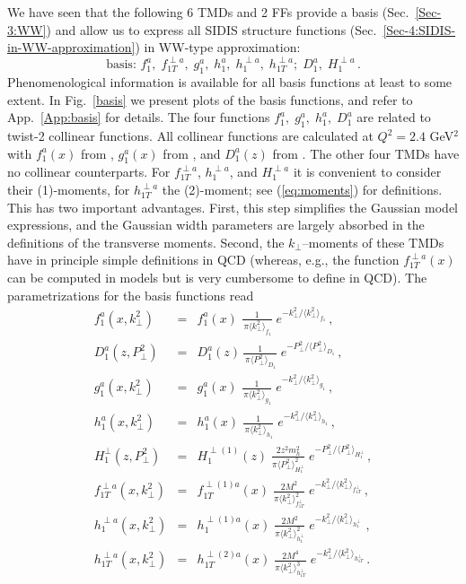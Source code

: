 \documentclass[a4paper,11pt]{article}
\newcommand{\be}{\begin{equation}}
\newcommand{\ee}{\end{equation}}
\newcommand{\ba}{\begin{eqnarray}}
\newcommand{\ea}{\end{eqnarray}}
\newcommand{\la}{\langle}
\newcommand{\ra}{\rangle}
\newcommand{\mh}{ m_h }
\def\kperp{k_\perp}
\def\pperp{P_\perp}
\def\avkperp{\la \kperp^2 \ra}
\def\avpperp{\la \pperp^2 \ra}
\begin{document}
We have seen that the following 6 TMDs and 2 FFs provide a basis
(Sec.~\ref{Sec-3:WW}) and allow us to express all SIDIS structure
functions (Sec.~\ref{Sec-4:SIDIS-in-WW-approximation})
in WW-type approximation:
\be\label{Eq:basis}
   \mbox{basis: \ \ }
   f_1^a, \; f_{1T}^{\perp a}, \; g_1^a, \; h_1^a, \;h_1^{\perp a},\; h_{1T}^{\perp a};
   \; D_1^a, \; H_1^{\perp a} \, .
\ee
Phenomenological information is available for all basis functions at
least to some extent.
In Fig.~\ref{basis} we present plots of the basis functions, and refer
to App.~\ref{App:basis} for details.
The four functions $f_1^a, \; g_1^a, \; h_1^a,\; D_1^a$  are related to
twist-2 collinear functions. All collinear functions are calculated at
$Q^2 = 2.4$ GeV$^2$ with $f_1^a(x)$ from \cite{Martin:2009iq},
$g_1^a(x)$ from \cite{Gluck:1998xa}, and $D_1^a(z)$ from
\cite{deFlorian:2007aj}. The other four TMDs
have no collinear counterparts.
For $f_{1T}^{\perp a}$, $h_1^{\perp a}$, and $H_1^{\perp a}$ it is convenient to
consider their (1)-moments, for $ h_{1T}^{\perp a}$  the (2)-moment;
see (\ref{eq:moments}) for definitions.
This has two important advantages. First, this step simplifies
the Gaussian model expressions, and the Gaussian width parameters are
largely absorbed in the definitions of the transverse moments. Second,
the $k_\perp$--moments of these TMDs have in principle simple definitions
in QCD (whereas, e.g., the function $f_{1T}^{\perp a}(x)$ can be computed in
models but is very cumbersome to define in QCD).
The parametrizations for the basis functions read
\begin{subequations}\ba
	f^a_1(x,\kperp^2) &=& f^a_1(x)\;
    	\frac{1}{\,\pi\avkperp_{f_1}}\;e^{-\kperp^2/\avkperp_{f_1}} \, ,
	\label{Eq:Gauss-f1}\\
    	D^a_1(z,\pperp^2) &=& D_1^a(z)\,
    	\frac{1}{\,\pi\avpperp_{D_1}}\;e^{-\pperp^2/\avpperp_{D_1}} \, ,
	\label{Eq:Gauss-D1}\\
	g^a_1(x,\kperp^2) &=& g^a_1(x)\;
    	\frac{1}{\,\pi\avkperp_{g_1}}\;e^{-\kperp^2/\avkperp_{g_1}} \, ,
	\label{Eq:Gauss-g1}\\
	h_{1}^{a} (x, \kperp^2) &=& h_{1}^{a} (x)\;
  	\frac{1}{\,\pi \avkperp_{h_1}}\;e^{-{\kperp^2}/{\avkperp_{h_1} }} \, ,
	\label{Eq:Gauss-h1}\\
	H_{1}^{\perp}(z,\pperp^2) &=&  H_{1}^{\perp (1)}(z) \;
	\frac{2 z^2 \mh^2}{\pi \avpperp_{H_{1}^\perp}^2} \;
	e^{-\pperp^2/{\avpperp_{H_{1}^\perp}}}\, ,\\
	f_{1T}^{\perp a}(x,\kperp^2) &=&  f_{1T}^{\perp (1) a}(x)   \;
	\frac{2 M^2}{\pi \avkperp_{f_{1T}^\perp}^2} \;
	e^{-\kperp^2/{\avkperp_{f_{1T}^\perp}}}
	\label{Eq:Gauss-f1Tperp}\, ,\\
	h_{1}^{\perp a}(x,\kperp^2) &=&  h_{1}^{\perp (1) a}(x)\;
   	\frac{2 M^2}{\pi \avkperp_{h_{1}^\perp}^2}\;
 	e^{-\kperp^2/{\avkperp_{h_{1}^\perp}}}\,
	\label{Eq:Gauss-h1perp}\, ,\\
	h_{1T}^{\perp a}(x,\kperp^2) &=&  h_{1T}^{\perp (2) a}(x)\;
   	\frac{2 M^4}{\pi \avkperp_{h_{1T}^\perp}^3} \;
	e^{-\kperp^2/{\avkperp_{h_{1T}^\perp}}}
	\label{Eq:Gauss-h1Tperp}\, .
\ea\end{subequations}
\end{document}
